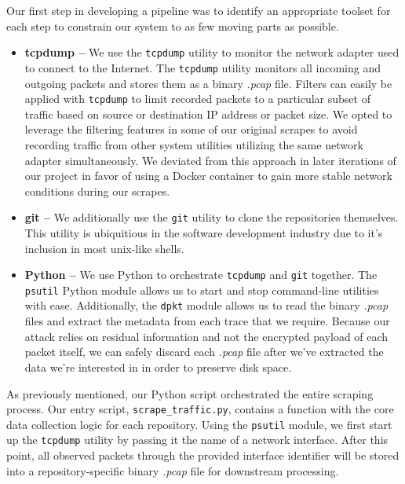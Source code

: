 \documentclass[sigconf,authorversion,nonacm]{acmart}
\begin{document}
Our first step in developing a pipeline was to identify an appropriate toolset for each step to constrain our system to as few moving parts as possible.
\begin{itemize}
  \item \textbf{tcpdump -- }We use the \texttt{tcpdump} utility to monitor the network adapter used to connect to the Internet. The \texttt{tcpdump} utility monitors all incoming and outgoing packets and stores them as a binary \textit{.pcap} file. Filters can easily be applied with \texttt{tcpdump} to limit recorded packets to a particular subset of traffic based on source or destination IP address or packet size. We opted to leverage the filtering features in some of our original scrapes to avoid recording traffic from other system utilities utilizing the same network adapter simultaneously. We deviated from this approach in later iterations of our project in favor of using a Docker container to gain more stable network conditions during our scrapes.
  \item \textbf{git -- }We additionally use the \texttt{git} utility to clone the repositories themselves. This utility is ubiquitious in the software development industry due to it's inclusion in most unix-like shells.
  \item \textbf{Python -- }We use Python to orchestrate \texttt{tcpdump} and \texttt{git} together. The \texttt{psutil} Python module allows us to start and stop command-line utilities with ease. Additionally, the \texttt{dpkt} module allows us to read the binary \textit{.pcap} files and extract the metadata from each trace that we require. Because our attack relies on residual information and not the encrypted payload of each packet itself, we can safely discard each \textit{.pcap} file after we've extracted the data we're interested in in order to preserve disk space.
\end{itemize}

As previously mentioned, our Python script orchestrated the entire scraping process. Our entry script, \texttt{scrape\_traffic.py}, contains a function with the core data collection logic for each repository. Using the \texttt{psutil} module, we first start up the \texttt{tcpdump} utility by passing it the name of a network interface. After this point, all observed packets through the provided interface identifier will be stored into a repository-specific binary \textit{.pcap} file for downstream processing. 
\end{document}
